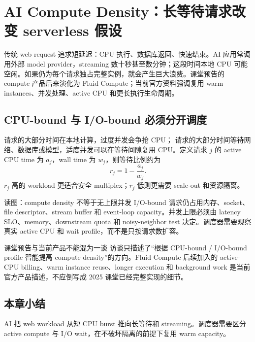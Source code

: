 \section{AI Compute Density：长等待请求改变 serverless 假设}

传统 web request 追求短延迟：CPU 执行、数据库返回、快速结束。AI 应用常调用外部 model provider，streaming 数十秒甚至数分钟；这段时间本地 CPU 可能空闲。如果仍为每个请求独占完整实例，就会产生巨大浪费。课堂预告的 compute 产品后来演化为 Fluid Compute；当前官方资料强调复用 warm instances、并发处理、active CPU 和更长执行生命周期。

\subsection{CPU-bound 与 I/O-bound 必须分开调度}

 请求的大部分时间在本地计算，过度并发会争抢 CPU； 请求的大部分时间等待网络、数据库或模型，适度并发可以在等待间隙复用 CPU。定义请求 $j$ 的 active CPU time 为 $a_j$，wall time 为 $w_j$，则等待比例约为
\[
r_j=1-\frac{a_j}{w_j}.
\]
$r_j$ 高的 workload 更适合安全 multiplex；$r_j$ 低则更需要 scale-out 和资源隔离。


\begin{knowledgebox}{读图：compute density 不等于无上限并发}
I/O-bound 请求仍占用内存、socket、file descriptor、stream buffer 和 event-loop capacity。并发上限必须由 latency SLO、memory、downstream quota 和 noisy-neighbor test 决定。调度器需要观察真实 active CPU 和 wait profile，而不是只按请求数扩容。
\end{knowledgebox}

\begin{warningbox}{课堂预告与当前产品不能混为一谈}
访谈只描述了“根据 CPU-bound / I/O-bound profile 智能提高 compute density”的方向。Fluid Compute 后续加入的 active-CPU billing、warm instance reuse、longer execution 和 background work 是当前官方产品描述，不应倒写成 2025 课堂已经完整实现的细节。
\end{warningbox}


\subsection{本章小结}

AI 把 web workload 从短 CPU burst 推向长等待和 streaming。调度器需要区分 active compute 与 I/O wait，在不破坏隔离的前提下复用 warm capacity。

